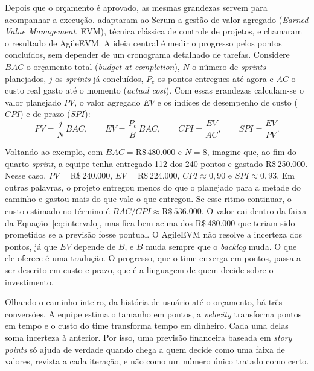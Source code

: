 Depois que o orçamento é aprovado, as mesmas grandezas servem para acompanhar a
execução.  adaptaram ao Scrum a gestão de valor
agregado (\textit{Earned Value Management}, EVM), técnica clássica de controle
de projetos, e chamaram o resultado de AgileEVM. A ideia central é medir o
progresso pelos pontos concluídos, sem depender de um cronograma detalhado de
tarefas. Considere $BAC$ o orçamento total (\textit{budget at completion}), $N$ o
número de \textit{sprints} planejados, $j$ os \textit{sprints} já concluídos,
$P_c$ os pontos entregues até agora e $AC$ o custo real gasto até o momento
(\textit{actual cost}). Com essas grandezas calculam-se o valor planejado $PV$,
o valor agregado $EV$ e os índices de desempenho de custo ($CPI$) e de prazo
($SPI$):
%
\begin{equation}
  PV = \frac{j}{N}\,BAC, \qquad
  EV = \frac{P_c}{B}\,BAC, \qquad
  CPI = \frac{EV}{AC}, \qquad
  SPI = \frac{EV}{PV} .
  \label{eq:agileevm}
\end{equation}

Voltando ao exemplo, com $BAC = \text{R\$}\,480.000$ e $N = 8$, imagine que, ao
fim do quarto \textit{sprint}, a equipe tenha entregado 112 dos 240 pontos e
gastado R\$\,250.000. Nesse caso, $PV = \text{R\$}\,240.000$,
$EV = \text{R\$}\,224.000$, $CPI \approx 0{,}90$ e $SPI \approx 0{,}93$. Em
outras palavras, o projeto entregou menos do que o planejado para a metade do caminho
e gastou mais do que vale o que entregou. Se esse ritmo continuar, o custo
estimado no término é $BAC/CPI \approx \text{R\$}\,536.000$. O valor cai dentro
da faixa da Equação~\ref{eq:intervalo}, mas fica bem acima dos R\$\,480.000 que
teriam sido prometidos se a previsão fosse pontual. O AgileEVM não resolve a
incerteza dos pontos, já que $EV$ depende de $B$, e $B$ muda sempre que o
\textit{backlog} muda. O que ele oferece é uma tradução. O progresso, que o time
enxerga em pontos, passa a ser descrito em custo e prazo, que é a linguagem de
quem decide sobre o investimento.

Olhando o caminho inteiro, da história de usuário até o orçamento, há três
conversões. A equipe estima o tamanho em pontos, a \textit{velocity}
transforma pontos em tempo e o custo do time transforma tempo em dinheiro. Cada
uma delas soma incerteza à anterior. Por isso, uma previsão financeira baseada
em \textit{story points} só ajuda de verdade quando chega a quem decide como
uma faixa de valores, revista a cada iteração, e não como um número único
tratado como certo.
